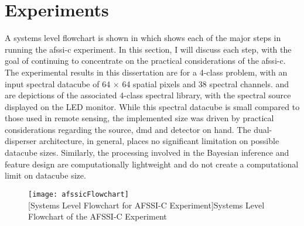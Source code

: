 \clearpage


\section{Experiments}

A systems level flowchart is shown in  which shows each of the major steps in running the \gls{afssi-c} experiment. In this section, I will discuss each step, with the goal of continuing to concentrate on the practical considerations of the \gls{afssi-c}. The experimental results in this dissertation are for a 4-class problem, with an input spectral datacube of 64 $\times$ 64 spatial pixels and 38 spectral channels.  and  are depictions of the associated 4-class spectral library, with the spectral source displayed on the LED monitor. While this spectral datacube is small compared to those used in remote sensing, the implemented size was driven by practical considerations regarding the source, \gls{dmd} and detector on hand. The dual-disperser architecture, in general, places no significant limitation on possible datacube sizes. Similarly, the processing involved in the Bayesian inference and feature design are computationally lightweight and do not create a computational limit on datacube size.


\begin{figure}[h!]
	\centering
	\texttt{[image: afssicFlowchart]}\\
	[Systems Level Flowchart for AFSSI-C Experiment]{Systems Level Flowchart of the AFSSI-C Experiment}
	\label{fig:afssicFlowchart}
\end{figure}


